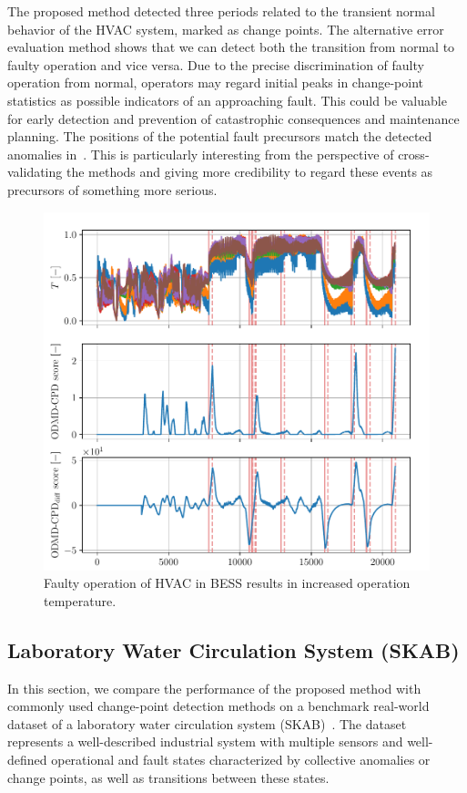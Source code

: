 The proposed method detected three periods related to the transient normal behavior of the HVAC system, marked as change points. The alternative error evaluation method shows that we can detect both the transition from normal to faulty operation and vice versa. Due to the precise discrimination of faulty operation from normal, operators may regard initial peaks in change-point statistics as possible indicators of an approaching fault. This could be valuable for early detection and prevention of catastrophic consequences and maintenance planning. The positions of the potential fault precursors match the detected anomalies in~\citet{Wadinger2024}. This is particularly interesting from the perspective of cross-validating the methods and giving more credibility to regard these events as precursors of something more serious.

\begin{figure}[H]
    \centering
    \includegraphics[width=\linewidth]{figures/bess-chd_p10-l2880_b240_t240roll_2880-dmd_w1.0-hx20.pdf}
    \caption{Faulty operation of HVAC in BESS results in increased operation temperature.}\label{fig:bess}
\end{figure}


\subsection{Laboratory Water Circulation System (SKAB)}
In this section, we compare the performance of the proposed method with commonly used change-point detection methods on a benchmark real-world dataset of a laboratory water circulation system (SKAB)~\citep{Katser2020}. The dataset represents a well-described industrial system with multiple sensors and well-defined operational and fault states characterized by collective anomalies or change points, as well as transitions between these states.

